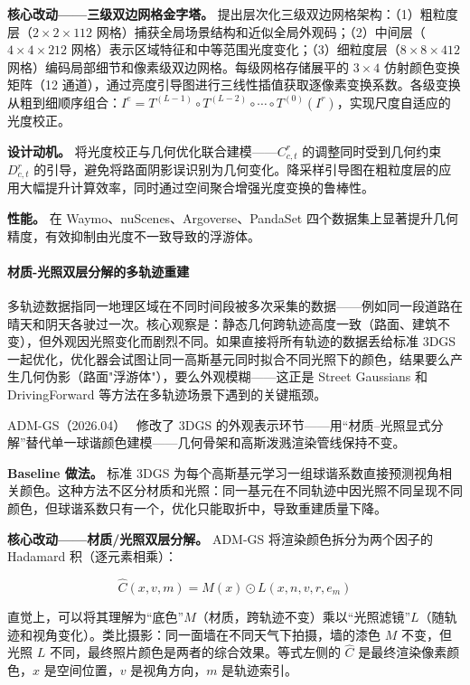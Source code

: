\textbf{核心改动——三级双边网格金字塔。} 提出层次化三级双边网格架构：（1）粗粒度层（$2 \times 2 \times 112$ 网格）捕获全局场景结构和近似全局外观码；（2）中间层（$4 \times 4 \times 212$ 网格）表示区域特征和中等范围光度变化；（3）细粒度层（$8 \times 8 \times 412$ 网格）编码局部细节和像素级双边网格。每级网格存储展平的 $3 \times 4$ 仿射颜色变换矩阵（12 通道），通过亮度引导图进行三线性插值获取逐像素变换系数。各级变换从粗到细顺序组合：$I^e = T^{(L-1)} \circ T^{(L-2)} \circ \cdots \circ T^{(0)}(I^r)$，实现尺度自适应的光度校正。

\textbf{设计动机。} 将光度校正与几何优化联合建模——$C_{c,t}^r$ 的调整同时受到几何约束 $D_{c,t}^r$ 的引导，避免将路面阴影误识别为几何变化。降采样引导图在粗粒度层的应用大幅提升计算效率，同时通过空间聚合增强光度变换的鲁棒性。

\textbf{性能。} 在 Waymo、nuScenes、Argoverse、PandaSet 四个数据集上显著提升几何精度，有效抑制由光度不一致导致的浮游体。

\paragraph{材质-光照双层分解的多轨迹重建}

多轨迹数据指同一地理区域在不同时间段被多次采集的数据——例如同一段道路在晴天和阴天各驶过一次。核心观察是：静态几何跨轨迹高度一致（路面、建筑不变），但外观因光照变化而剧烈不同。如果直接将所有轨迹的数据丢给标准 3DGS 一起优化，优化器会试图让同一高斯基元同时拟合不同光照下的颜色，结果要么产生几何伪影（路面"浮游体"），要么外观模糊——这正是 Street Gaussians 和 DrivingForward 等方法在多轨迹场景下遇到的关键瓶颈。

ADM-GS（2026.04）~\cite{2604_05908} 修改了 3DGS 的外观表示环节——用``材质--光照显式分解''替代单一球谐颜色建模——几何骨架和高斯泼溅渲染管线保持不变。

\textbf{Baseline 做法。} 标准 3DGS 为每个高斯基元学习一组球谐系数直接预测视角相关颜色。这种方法不区分材质和光照：同一基元在不同轨迹中因光照不同呈现不同颜色，但球谐系数只有一个，优化只能取折中，导致重建质量下降。

\textbf{核心改动——材质/光照双层分解。} ADM-GS 将渲染颜色拆分为两个因子的 Hadamard 积（逐元素相乘）：

\begin{equation}
\hat{C}(x, v, m) = M(x) \odot L(x, n, v, r, e_m)
\end{equation}

直觉上，可以将其理解为``底色''$M$（材质，跨轨迹不变）乘以``光照滤镜''$L$（随轨迹和视角变化）。类比摄影：同一面墙在不同天气下拍摄，墙的漆色 $M$ 不变，但光照 $L$ 不同，最终照片颜色是两者的综合效果。等式左侧的 $\hat{C}$ 是最终渲染像素颜色，$x$ 是空间位置，$v$ 是视角方向，$m$ 是轨迹索引。

